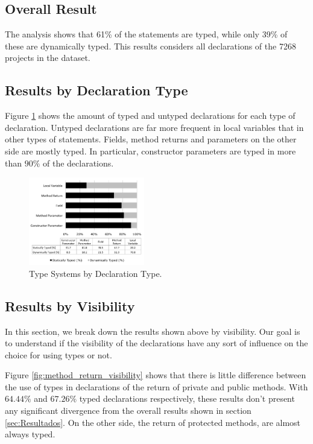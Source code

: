 \documentclass[preprint]{sigplanconf}
\begin{document}
\subsection{Overall Result\label{sub:overall-result}}
The analysis shows that 61\% of the statements are typed, while only 39\% of these are dynamically typed. This results considers all declarations of the 7268 projects in the dataset.


\subsection{Results by Declaration Type\label{sub:declaration-type-results}}
Figure \ref{fig:tipo_declaracao} shows the amount of typed and untyped declarations for each type of declaration. 
Untyped declarations are far more frequent in local variables that in other types of statements.
Fields, method returns and parameters on the other side are mostly typed. In particular, constructor parameters are typed in more than $90\%$ of the declarations.

\begin{figure}[ht]
\centering 
\includegraphics[width=0.45\textwidth]{tipo} 
\caption{Type Systems by Declaration Type.}
\label{fig:tipo_declaracao} 
\end{figure}

\subsection{Results by Visibility\label{sub:visibility-results}}
In this section, we break down the results shown above by visibility. Our goal is to understand if the visibility of the declarations have any sort of influence on the choice for using types or not.

Figure \ref{fig:method_return_visibility} shows that there is little difference between the use of types in declarations of the return of private and public methods. 
With $64.44\%$ and $67.26\%$ typed declarations respectively, these results don't present any significant divergence from the overall results shown in section \ref{sec:Resultados}.
On the other side, the return of protected methods, are almost always typed.
\end{document}
